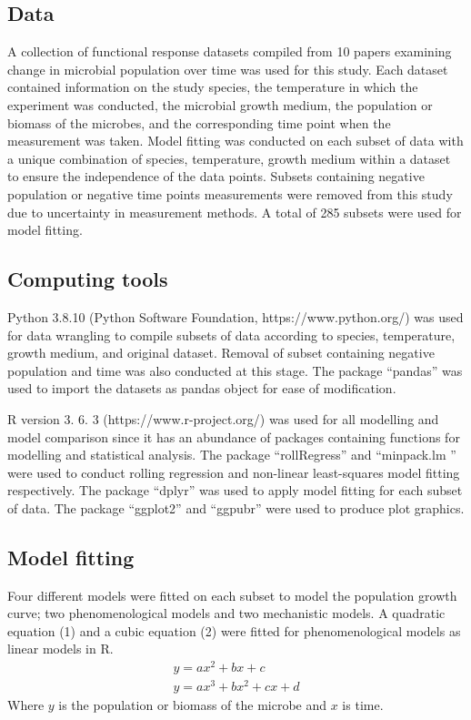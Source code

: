 \documentclass[11pt, a4paper]{article}
\begin{document}
\subsection{Data}
A collection of functional response datasets compiled from 10 papers examining change in microbial population over time was used for this study. Each dataset contained information on the study species, the temperature in which the experiment was conducted, the microbial growth medium, the population or biomass of the microbes, and the corresponding time point when the measurement was taken. Model fitting was conducted on each subset of data with a unique combination of species, temperature, growth medium within a dataset to ensure the independence of the data points. Subsets containing negative population or negative time points measurements were removed from this study due to uncertainty in measurement methods. A total of 285 subsets were used for model fitting.
 
\subsection{Computing tools}
Python 3.8.10 (Python Software Foundation, https://www.python.org/) was used for data wrangling to compile subsets of data according to species, temperature, growth medium, and original dataset. Removal of subset containing negative population and time was also conducted at this stage. The package “pandas” was used to import the datasets as pandas object for ease of modification. \par

R version 3. 6. 3 (https://www.r-project.org/) was used for all modelling and model comparison since it has an abundance of packages containing functions for modelling and statistical analysis. The package “rollRegress” and “minpack.lm ” were used to conduct rolling regression and non-linear least-squares model fitting respectively.  The package “dplyr” was used to apply model fitting for each subset of data. The package “ggplot2” and “ggpubr” were used to produce plot graphics. 


\subsection{Model fitting}
Four different models were fitted on each subset to model the population growth curve; two phenomenological models and two mechanistic models. A quadratic equation (1) and a cubic equation (2) were fitted for phenomenological models as linear models in R.
\begin{align}
y = ax^2 + bx + c \\
y = ax^3 + bx^2 + cx + d
\end{align}
Where $y$ is the population or biomass of the microbe and $x$ is time. \par
\end{document}
